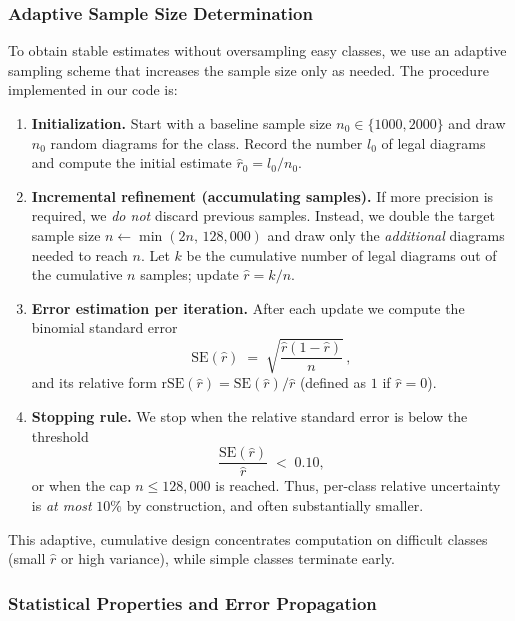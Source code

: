 \documentclass[12pt]{article}
\begin{document}
\subsubsection{Adaptive Sample Size Determination}

To obtain stable estimates without oversampling easy classes, we use an adaptive sampling scheme that increases the sample size only as needed. The procedure implemented in our code is:

\begin{enumerate}
  \item \textbf{Initialization.} Start with a baseline sample size $n_0 \in \{1000, 2000\}$ and draw $n_0$ random diagrams for the class. Record the number $l_0$ of legal diagrams and compute the initial estimate $\hat{r}_0 = l_0/n_0$.
  \item \textbf{Incremental refinement (accumulating samples).} If more precision is required, we \emph{do not} discard previous samples. Instead, we double the target sample size $n \leftarrow \min(2n,\,128{,}000)$ and draw only the \emph{additional} diagrams needed to reach $n$. Let $k$ be the cumulative number of legal diagrams out of the cumulative $n$ samples; update $\hat{r}=k/n$.
  \item \textbf{Error estimation per iteration.} After each update we compute the binomial standard error
  \begin{equation}
     \mathrm{SE}(\hat{r}) \;=\; \sqrt{\frac{\hat{r}(1-\hat{r})}{n}}\, ,
  \end{equation}
  and its relative form $\mathrm{rSE}(\hat{r}) = \mathrm{SE}(\hat{r})/\hat{r}$ (defined as $1$ if $\hat{r}=0$).
  \item \textbf{Stopping rule.} We stop when the relative standard error is below the threshold
  \begin{equation}
     \frac{\mathrm{SE}(\hat{r})}{\hat{r}} \;<\; 0.10,
  \end{equation}
  or when the cap $n \le 128{,}000$ is reached. Thus, per-class relative uncertainty is \emph{at most} $10\%$ by construction, and often substantially smaller.
\end{enumerate}

This adaptive, cumulative design concentrates computation on difficult classes (small $\hat{r}$ or high variance), while simple classes terminate early.

\subsubsection{Statistical Properties and Error Propagation}
\end{document}
